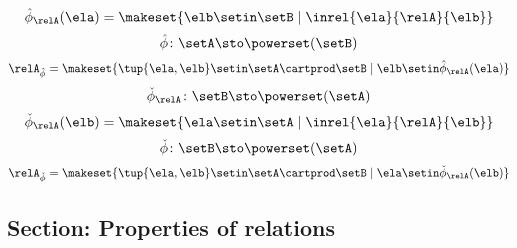 {\begin{forslides}
\begin{equation}
        \end{equation}
        \begin{equation}
            \label{eq:slides_session2_rel_119}
            \hat \phi_{\relA} (\ela) = \makeset{ \elb \setin \setB \mid \inrel{\ela}{\relA}{\elb}}
        \end{equation}
        \begin{equation}
            \label{eq:slides_session2_rel_120}
            \hat \phi \colon \setA \sto \powerset (\setB)
        \end{equation}
        \begin{equation}
            \label{eq:slides_session2_rel_121}
            \relA_{\hat \phi} = \makeset{ \tup{\ela, \elb} \setin \setA \cartprod \setB \mid \elb \setin \hat \phi_{\relA}(\ela)  }
        \end{equation}
        \begin{equation}
            \label{eq:slides_session2_rel_122}
            \check \phi_{\relA} \colon \setB \sto \powerset (\setA)
        \end{equation}
        \begin{equation}
            \label{eq:slides_session2_rel_123}
            \check \phi_{\relA} (\elb) = \makeset{ \ela \setin \setA \mid \inrel{\ela}{\relA}{\elb}}
        \end{equation}
        \begin{equation}
            \label{eq:slides_session2_rel_124}
            \check \phi \colon \setB \sto \powerset (\setA)
        \end{equation}
        \begin{equation}
            \label{eq:slides_session2_rel_125}
            \relA_{\check \phi} = \makeset{ \tup{\ela, \elb} \setin \setA \cartprod \setB \mid \ela \setin \check \phi_{\relA}(\elb)}
        \end{equation}

        \subsection{Section: Properties of relations}


\end{forslides}}

